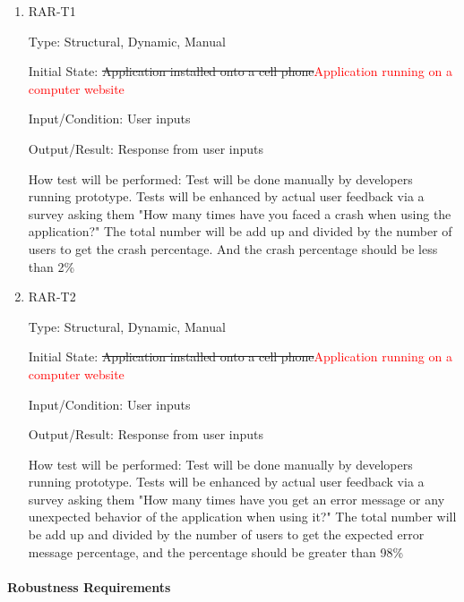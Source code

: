 \documentclass[12pt, titlepage]{article}
\begin{document}
\begin{enumerate}

\item{RAR-T1\\}

Type: Structural, Dynamic, Manual
					
Initial State: \sout{Application installed onto a cell phone}\textcolor{red}{Application running on a computer website}
					
Input/Condition: User inputs
					
Output/Result: Response from user inputs
					
How test will be performed: Test will be done manually by developers running prototype. Tests will be enhanced by actual user feedback via a survey asking them "How many times have you faced a crash when using the application?" The total number will be add up and divided by the number of users to get the crash percentage. And the crash percentage should be less than 2\%
					
\item{RAR-T2\\}

Type: Structural, Dynamic, Manual
					
Initial State: \sout{Application installed onto a cell phone}\textcolor{red}{Application running on a computer website}
					
Input/Condition: User inputs
					
Output/Result: Response from user inputs
					
How test will be performed: Test will be done manually by developers running prototype. Tests will be enhanced by actual user feedback via a survey asking them "How many times have you get an error message or any unexpected behavior of the application when using it?" The total number will be add up and divided by the number of users to get the expected error message percentage, and the percentage should be greater than 98\%

\end{enumerate}

\paragraph{Robustness Requirements}
\end{document}
